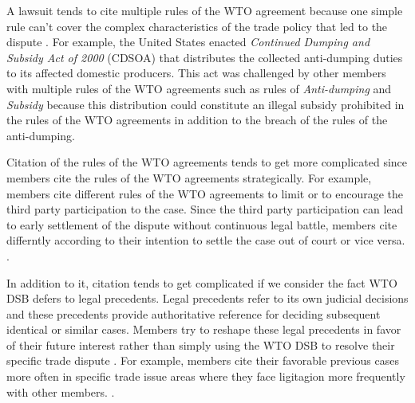 A lawsuit tends to cite multiple rules of the WTO agreement because one simple rule can't cover the complex characteristics of the trade policy that led to the dispute \citep{palmeter2004dispute}.
For example, the United States enacted \textit{Continued Dumping and Subsidy Act of 2000} (CDSOA) that distributes
the collected anti-dumping duties to its affected domestic producers. 
This act was challenged by other members with multiple rules of 
the WTO agreements such as rules of \textit{Anti-dumping} and \textit{Subsidy} because
this distribution could constitute an illegal subsidy prohibited
in the rules of the WTO agreements in addition to the breach of the rules of the anti-dumping. %

Citation of the rules of the WTO agreements tends to get more complicated since members cite the
rules of the WTO agreements strategically. For example,
members cite different rules of the WTO agreements to limit or to encourage
the third party participation to the case. Since the third party participation
can lead to early settlement of the dispute without continuous
legal battle, members cite differntly according to their intention to 
settle the case out of court or vice versa. 
\citep{who_gets}.

In addition to it, citation tends to get complicated
if we consider the fact WTO DSB defers to legal precedents.
Legal precedents refer to its own judicial decisions
and these precedents provide authoritative reference
for deciding subsequent identical or similar cases.
Members try to reshape these legal precedents
in favor of their future interest rather than
simply using the WTO DSB to resolve their specific trade
dispute \citep{pelc}. For example,
members cite their
favorable previous cases more often in specific
trade issue areas where they face ligitagion more frequently with other members.
\citep{latent}.
 

